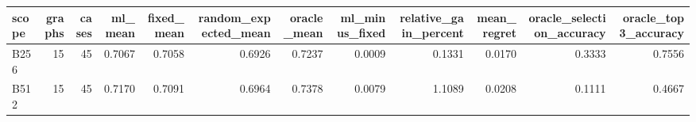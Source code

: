 \begin{tabular}{lrrrrrrrrrrr}
\toprule
scope & graphs & cases & ml_mean & fixed_mean & random_expected_mean & oracle_mean & ml_minus_fixed & relative_gain_percent & mean_regret & oracle_selection_accuracy & oracle_top3_accuracy \\
\midrule
B256 & 15 & 45 & 0.7067 & 0.7058 & 0.6926 & 0.7237 & 0.0009 & 0.1331 & 0.0170 & 0.3333 & 0.7556 \\
B512 & 15 & 45 & 0.7170 & 0.7091 & 0.6964 & 0.7378 & 0.0079 & 1.1089 & 0.0208 & 0.1111 & 0.4667 \\
\bottomrule
\end{tabular}
